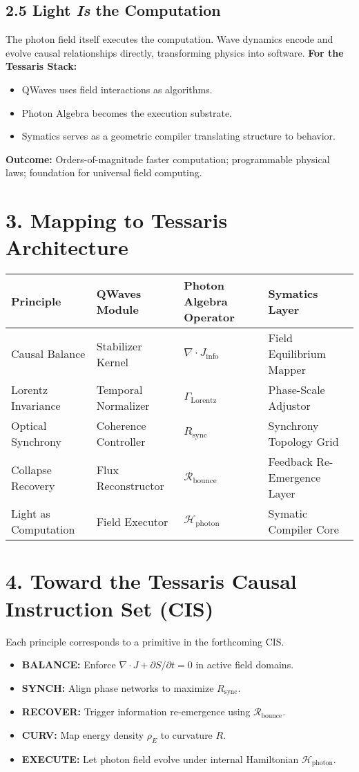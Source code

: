 \documentclass[11pt,a4paper]{article}
\begin{document}
\subsection*{2.5 Light \textit{Is} the Computation}
The photon field itself executes the computation.  
Wave dynamics encode and evolve causal relationships directly, transforming physics into software.  
\textbf{For the Tessaris Stack:}
\begin{itemize}
  \item QWaves uses field interactions as algorithms.
  \item Photon Algebra becomes the execution substrate.
  \item Symatics serves as a geometric compiler translating structure to behavior.
\end{itemize}
\textbf{Outcome:} Orders-of-magnitude faster computation; programmable physical laws; foundation for universal field computing.

\section{3. Mapping to Tessaris Architecture}

\begin{longtable}{|l|l|l|l|}
\hline
\textbf{Principle} & \textbf{QWaves Module} & \textbf{Photon Algebra Operator} & \textbf{Symatics Layer} \\
\hline
Causal Balance & Stabilizer Kernel & $\nabla\!\cdot\!J_{\mathrm{info}}$ & Field Equilibrium Mapper \\
Lorentz Invariance & Temporal Normalizer & $\Gamma_{\mathrm{Lorentz}}$ & Phase-Scale Adjustor \\
Optical Synchrony & Coherence Controller & $R_{\mathrm{sync}}$ & Synchrony Topology Grid \\
Collapse Recovery & Flux Reconstructor & $\mathcal{R}_{\mathrm{bounce}}$ & Feedback Re-Emergence Layer \\
Light as Computation & Field Executor & $\mathcal{H}_{\mathrm{photon}}$ & Symatic Compiler Core \\
\hline
\end{longtable}

\section{4. Toward the Tessaris Causal Instruction Set (CIS)}
Each principle corresponds to a primitive in the forthcoming CIS.  
\begin{itemize}
  \item \textbf{BALANCE:} Enforce $\nabla\!\cdot\!J + \partial S/\partial t = 0$ in active field domains.  
  \item \textbf{SYNCH:} Align phase networks to maximize $R_{\mathrm{sync}}$.  
  \item \textbf{RECOVER:} Trigger information re-emergence using $\mathcal{R}_{\mathrm{bounce}}$.  
  \item \textbf{CURV:} Map energy density $\rho_E$ to curvature $R$.  
  \item \textbf{EXECUTE:} Let photon field evolve under internal Hamiltonian $\mathcal{H}_{\mathrm{photon}}$.  
\end{itemize}
\end{document}
